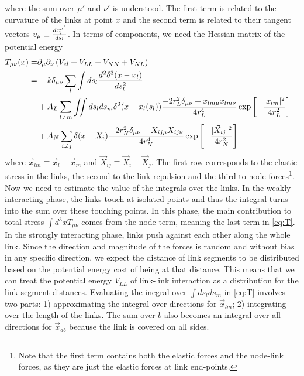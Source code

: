\documentclass[nofootinbib,preprint,floatfix,titlepage,endfloats,superscriptaddress]{revtex4} %
\begin{document}
where the sum over $\mu'$ and $\nu'$ is understood. 
The first term is related to the curvature of the links at point $x$ and the second term is related to their tangent vectors $v_\mu \equiv {d x_l^{\mu'}\over ds_l}$.  
In terms of components, we need the Hessian matrix of the potential energy
\begin{align}
    T_{\mu\nu}(x) =&  %
    \ro_\mu \ro_\nu \pr{V_{el}+V_{LL} + V_{NN}+V_{NL}} \cr
    =& %
    -{k}\delta_{\mu\nu} \sum_l\int ds_l {d^2 \delta^3(x-x_l)\over ds_l^2} \cr
    & + A_L \sum_{l\ne m} \iint ds_l ds_m \delta^3(x-x_l(s_l))\frac{-2r_L^2\delta_{\mu\nu}+ x_{lm\mu} x_{lm\nu}}{4r_L^4}
     \exp\left[- {|x_{lm}|^2 \over 4 r_L^2}\right]\cr
    &+ A_N\sum_{i\ne j}\delta(x-X_i)\frac{-2r_N^2\delta_{\mu\nu}+ X_{ij\mu}X_{ij\nu}}{4r_N^4}
    \exp\left[- {|\vec{X}_{ij}|^2 \over 4 r_N^2}\right]
    \label{eq:T}
\end{align}
where $\vec{x}_{lm} \equiv \vec{x}_l-\vec{x}_m$ and $\vec{X}_{ij} \equiv \vec{X}_i-\vec{X}_j$. The first row corresponds to the elastic stress in the links, the second to the link repulsion and the third to node forces\footnote{
Note that the first term contains both the elastic forces and the node-link forces, as they are just the elastic forces at link end-points.}. 
Now we need to estimate the value of the integrals over the links.
In the weakly interacting phase, the links touch at isolated points and thus the integral turns into the sum over these touching points. 
In this phase, the main contribution to total stress $\int d^3 x T_{\mu\nu}$ comes from the node term, meaning the last term in \eqref{eq:T}. 
In the strongly interacting phase, links push against each other along the whole link. 
Since the direction and magnitude of the forces is random and without bias in any specific direction, we expect the distance of link segments to be distributed based on the potential energy cost of being at that distance. 
This means that we can treat the potential energy $V_{LL}$ of link-link interaction as a distribution for the link segment distances. 
Evaluating the inegral over $\int ds_lds_m$ in \eqref{eq:T} involves two parts: 1) approximating the integral over directions for $\vec{x}_{lm}$; 2) integrating over the length of the links. 
The sum over $b$ also becomes an integral over all directions for $\vec{x}_{ab}$ because the link is covered on all sides. 
\end{document}
